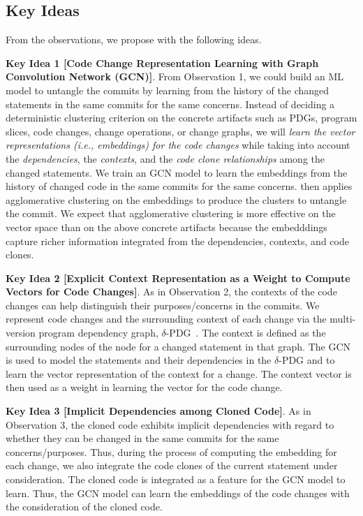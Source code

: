 \subsection{Key Ideas}
\label{ideas:sec}

From the observations, we propose {\tool} with the following ideas.

{\bf Key Idea 1 [Code Change Representation Learning with Graph
    Convolution Network (GCN)]}. From Observation 1, we could build an
ML model to untangle the commits by learning from the history of the
changed statements in the same commits for the same concerns. Instead
of deciding a deterministic clustering criterion on the concrete
artifacts such as PDGs, program slices, code changes, change
operations, or change graphs, we will {\em learn the vector
  representations (i.e., embeddings) for the code changes} while
taking into account the {\em dependencies}, the {\em contexts}, and
the {\em code clone relationships} among the changed statements. We
train an GCN model to learn the embeddings from the history of changed
code in the same commits for the same concerns. {\tool} then applies
agglomerative clustering on the embeddings to produce the clusters to
untangle the commit. We expect that agglomerative clustering is more
effective on the vector space than on the above concrete artifacts
because the embedddings capture richer information integrated from the
dependencies, contexts, and code clones.


{\bf Key Idea 2 [Explicit Context Representation as a Weight to
    Compute Vectors for Code Changes]}. As in Observation 2, the
contexts of the code changes can help distinguish their
purposes/concerns in the commits. We represent code changes and the
surrounding context of each change via the multi-version program
dependency graph, $\delta$-PDG~\cite{flexeme-fse20}. The context is
defined as the surrounding nodes of the node for a changed statement
in that graph. The GCN is used to model the statements and their
dependencies in the $\delta$-PDG and to learn the vector
representation of the context for a change. The context vector is then
used as a weight in learning the vector for the code change.

{\bf Key Idea 3 [Implicit Dependencies among Cloned Code]}. As in
Observation 3, the cloned code exhibits implicit dependencies with
regard to whether they can be changed in the same commits for the same
concerns/purposes. Thus, during the process of computing the embedding
for each change, we also integrate the code clones of the current
statement under consideration. The cloned code is integrated as a
feature for the GCN model to learn. Thus, the GCN model can learn the
embeddings of the code changes with the consideration of the cloned
code.
